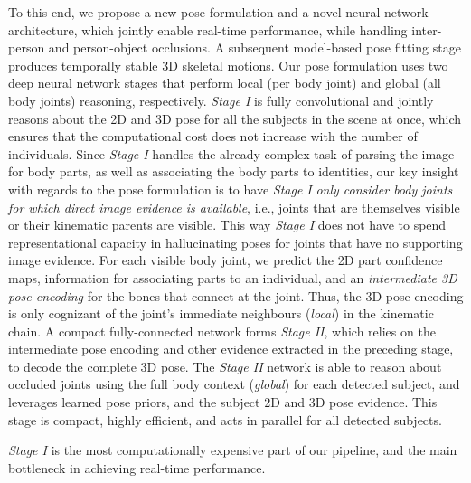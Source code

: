 \documentclass[acmtog,authorversion]{acmart}
\begin{document}
To this end, we propose a new pose formulation and a novel neural network architecture, which jointly enable real-time performance, while handling inter-person and person-object occlusions. A subsequent model-based pose fitting stage produces temporally stable 3D skeletal motions. 
Our pose formulation uses two deep neural network stages that perform local (per body joint) and global (all body joints) reasoning, respectively. \textit{Stage I} is fully convolutional and jointly reasons about the 2D and 3D pose for all the subjects in the scene at once, which ensures that the computational cost does not increase with the number of individuals. 
Since \textit{Stage I} handles the already complex task of parsing the image for body parts, as well as associating the body parts to identities, our key insight with regards to the pose formulation is to have \textit{Stage I} \emph{only consider body joints for which direct image evidence is available}, i.e., joints that are themselves visible or their kinematic parents are visible. This way \textit{Stage I} does not have to spend representational capacity in hallucinating poses for joints that have no supporting image evidence. 
For each visible body joint, we predict the 2D part confidence maps, information for associating parts to an individual, and an \emph{intermediate 3D pose encoding} for the bones that connect at the joint. Thus, the 3D pose encoding is only cognizant of the joint's immediate neighbours (\textit{local}) in the kinematic chain.  
A compact fully-connected network forms \textit{Stage II}, which relies on the intermediate pose encoding and other evidence extracted in the preceding stage, to decode the complete 3D pose. 
The \textit{Stage II} network 
is able to reason about occluded joints using the full body context (\emph{global}) for each detected subject, and leverages learned pose priors, and the subject 2D and 3D pose evidence.
This stage is compact, highly efficient, and acts in parallel for all detected subjects. 

\textit{Stage I} is the most computationally expensive part of our pipeline, and the main bottleneck in achieving real-time performance.
\end{document}

